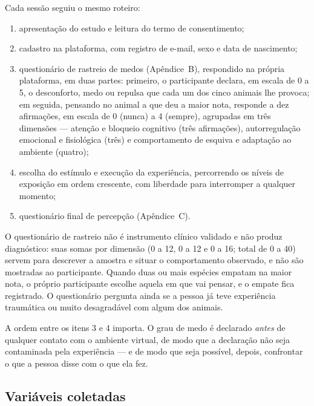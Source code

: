 Cada sessão seguiu o mesmo roteiro:

\begin{enumerate}
  \item apresentação do estudo e leitura do termo de consentimento;
  \item cadastro na plataforma, com registro de e-mail, sexo e data de
  nascimento;
  \item questionário de rastreio de medos (Apêndice~B), respondido na
  própria plataforma, em duas partes: primeiro, o participante declara,
  em escala de 0 a 5, o desconforto, medo ou repulsa que cada um dos
  cinco animais lhe provoca; em seguida, pensando no animal a que deu a
  maior nota, responde a dez afirmações, em escala de 0 (nunca) a 4
  (sempre), agrupadas em três dimensões --- atenção e bloqueio cognitivo
  (três afirmações), autorregulação emocional e fisiológica (três) e
  comportamento de esquiva e adaptação ao ambiente (quatro);
  \item escolha do estímulo e execução da experiência, percorrendo os
  níveis de exposição em ordem crescente, com liberdade para interromper
  a qualquer momento;
  \item questionário final de percepção (Apêndice~C).
\end{enumerate}

O questionário de rastreio não é instrumento clínico validado e não
produz diagnóstico: suas somas por dimensão (0 a 12, 0 a 12 e 0 a 16;
total de 0 a 40) servem para descrever a amostra e situar o
comportamento observado, e não são mostradas ao participante. Quando
duas ou mais espécies empatam na maior nota, o próprio participante
escolhe aquela em que vai pensar, e o empate fica registrado. O
questionário pergunta ainda se a pessoa já teve experiência traumática
ou muito desagradável com algum dos animais.

A ordem entre os itens 3 e 4 importa. O grau de medo é declarado
\emph{antes} de qualquer contato com o ambiente virtual, de modo que a
declaração não seja contaminada pela experiência --- e de modo que seja
possível, depois, confrontar o que a pessoa disse com o que ela fez.

\subsection{Variáveis coletadas}
\label{sec:variaveis}


